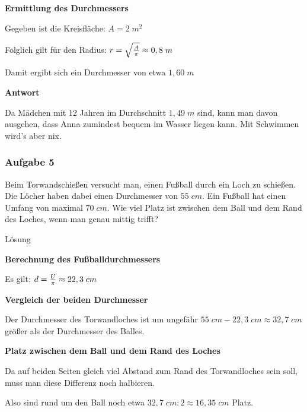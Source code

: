 \documentclass[
  ngerman,
]{book}
\begin{document}
\textbf{Ermittlung des Durchmessers}

Gegeben ist die Kreisfläche: \(A = 2\;m^2\)

Folglich gilt für den Radius: \(r = \sqrt{A \over \pi} \approx 0,8\;m\)

Damit ergibt sich ein Durchmesser von etwa \(1,60\;m\)

\textbf{Antwort}

Da Mädchen mit 12 Jahren im Durchschnitt \(1,49\;m\) sind, kann man davon ausgehen, dass Anna zumindest bequem im Wasser liegen kann. Mit Schwimmen wird's aber nix.

\hypertarget{section-57}{%
\subsubsection*{}\label{section-57}}

\hypertarget{aufgabe-5-2}{%
\subsubsection*{Aufgabe 5}\label{aufgabe-5-2}}

Beim Torwandschießen versucht man, einen Fußball durch ein Loch zu schießen. Die Löcher haben dabei einen Durchmesser von \(55\;cm\). Ein Fußball hat einen Umfang von maximal \(70\;cm\). Wie viel Platz ist zwischen dem Ball und dem Rand des Loches, wenn man genau mittig trifft?

Lösung

\textbf{Berechnung des Fußballdurchmessers}

Es gilt: \(d={U \over \pi} \approx 22,3\;cm\)

\textbf{Vergleich der beiden Durchmesser}

Der Durchmesser des Torwandloches ist um ungefähr \(55\;cm - 22,3\;cm \approx 32,7\;cm\) größer als der Durchmesser des Balles.

\textbf{Platz zwischen dem Ball und dem Rand des Loches}

Da auf beiden Seiten gleich viel Abstand zum Rand des Torwandloches sein soll, muss man diese Differenz noch halbieren.

Also sind rund um den Ball noch etwa \(32,7\;cm : 2 \approx 16,35\;cm\) Platz.

\hypertarget{section-58}{%
\subsubsection*{}\label{section-58}}
\end{document}
